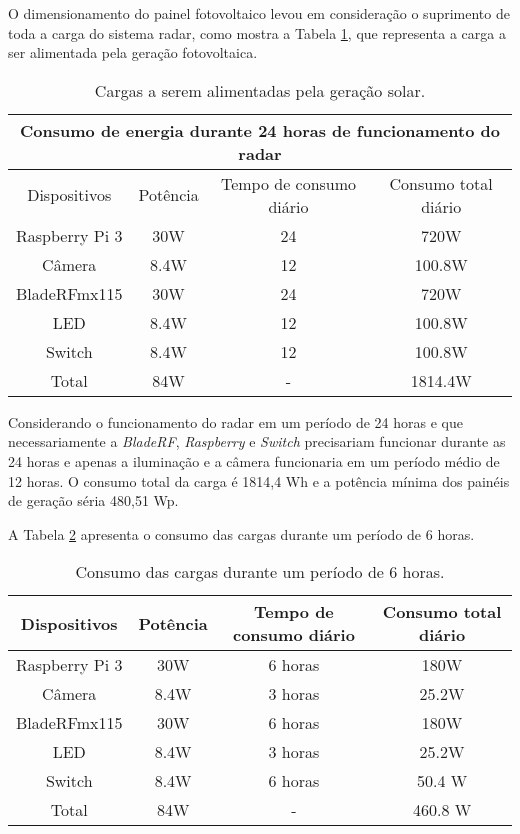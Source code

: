 O dimensionamento do painel fotovoltaico levou em consideração o suprimento de toda a carga do sistema radar, como mostra a Tabela \ref{tab24}, que representa a carga a ser alimentada pela geração fotovoltaica. 

\begin{table}[H]
\caption{Cargas a serem alimentadas pela geração solar.}\label{tab24}
\begin{tabular}{|c|c|c|c|}
\hline
\multicolumn{4}{|c|}{Consumo de energia durante 24 horas de funcionamento do radar}                                                 \\ \hline
Dispositivos & Potência & Tempo de consumo diário & Consumo total diário \\ \hline
Raspberry Pi 3  & 30W  & 24  & 720W  \\ \hline
Câmera & 8.4W  & 12 & 100.8W \\ \hline
BladeRFmx115 & 30W  & 24 & 720W \\ \hline
LED       & 8.4W &  12 & 100.8W  \\ \hline
Switch       & 8.4W &  12 & 100.8W \\ \hline
Total & 84W & - & 1814.4W \\ \hline

\end{tabular}
\end{table}
\FloatBarrier

Considerando o funcionamento do radar em um período de 24 horas e que necessariamente a \textit{BladeRF}, \textit{Raspberry} e \textit{Switch} precisariam funcionar durante as 24 horas e apenas a iluminação e a câmera funcionaria em um período médio de 12 horas. O consumo total da carga é 1814,4 Wh e a potência mínima dos painéis de geração séria 480,51 Wp.

A Tabela \ref{tab6} apresenta o consumo das cargas durante um período de 6 horas.

\begin{table}[H]
\caption{Consumo das cargas durante um período de 6 horas.}\label{tab6}
\begin{tabular}{|c|c|c|c|} 

\hline
Dispositivos             & Potência         & Tempo de consumo diário & Consumo total diário \\ \hline
Raspberry Pi 3  & 30W  & 6 horas          & 180W    \\ \hline
Câmera & 8.4W  &   3 horas        & 25.2W \\ \hline
BladeRFmx115 & 30W  & 6 horas         & 180W \\ \hline
LED       & 8.4W &  3 horas & 25.2W    \\ \hline
Switch       & 8.4W &  6 horas & 50.4 W    \\ \hline
Total & 84W & - & 460.8 W \\ \hline

\end{tabular}
\end{table}
\FloatBarrier

